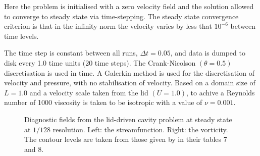 Here the problem is initialised with a zero velocity field and the solution
allowed to converge to steady state via time-stepping. The steady state convergence criterion is
that in the infinity norm the velocity varies by less that $10^{-6}$ between time levels.

The time step is constant between all runs, $\Delta t = 0.05$, and data is dumped to disk every
1.0 time units (20 time steps). The Crank-Nicolson $(\theta=0.5)$ discretisation is used in time. 
A \Poo Galerkin method is used for the discretisation of velocity and pressure, with no stabilisation
of velocity. Based on a domain size of $L=1.0$ and a velocity scale taken from the lid $(U=1.0)$, to achive
a Reynolds number of 1000 viscosity is taken to be isotropic with a value of $\nu=0.001$.

 

\begin{figure}
\centering
{}
\caption{Diagnostic fields from the lid-driven cavity problem at steady state at $1/128$ resolution.
Left: the streamfunction. Right: the vorticity. The contour levels are taken from those given by \cite{botella1998} in their tables
7 and 8.}
\label{fig:driven_cavity1}
\end{figure}


